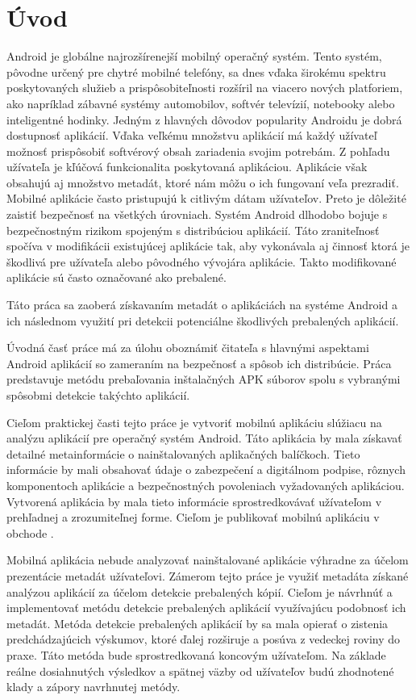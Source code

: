 \chapter{Úvod}
Android je globálne najrozšírenejší mobilný operačný systém. Tento systém, pôvodne určený pre chytré mobilné telefóny, sa dnes vďaka širokému spektru poskytovaných služieb a prispôsobiteľnosti rozšíril na viacero nových platforiem, ako napríklad zábavné systémy automobilov, softvér televízií, notebooky alebo inteligentné hodinky. Jedným z hlavných dôvodov popularity Androidu je dobrá dostupnosť aplikácií. Vďaka veľkému množstvu aplikácií má každý užívateľ možnosť prispôsobiť softvérový obsah zariadenia svojim potrebám. Z pohľadu užívateľa je kľúčová funkcionalita poskytovaná aplikáciou. Aplikácie však obsahujú aj množstvo metadát, ktoré nám môžu o ich fungovaní veľa prezradiť. Mobilné aplikácie často pristupujú k citlivým dátam užívateľov. Preto je dôležité zaistiť bezpečnosť na všetkých úrovniach. Systém Android dlhodobo bojuje s bezpečnostným rizikom spojeným s distribúciou aplikácií. Táto zraniteľnosť spočíva v modifikácii existujúcej aplikácie tak, aby vykonávala aj činnosť ktorá je škodlivá pre užívateľa alebo pôvodného vývojára aplikácie. Takto modifikované aplikácie sú často označované ako prebalené.

Táto práca sa zaoberá získavaním metadát o aplikáciách na systéme Android a ich následnom využití pri detekcii potenciálne škodlivých prebalených aplikácií.

Úvodná časť práce má za úlohu oboznámiť čitateľa s hlavnými aspektami Android aplikácií so zameraním na bezpečnosť a spôsob ich distribúcie. Práca predstavuje metódu prebaľovania inštalačných APK súborov spolu s vybranými spôsobmi detekcie takýchto aplikácií.

Cieľom praktickej časti tejto práce je vytvoriť mobilnú aplikáciu slúžiacu na analýzu aplikácií pre operačný systém Android. Táto aplikácia by mala získavať detailné metainformácie o nainštalovaných aplikačných balíčkoch. Tieto informácie by mali obsahovať údaje o zabezpečení a digitálnom podpise, rôznych komponentoch aplikácie a bezpečnostných povoleniach vyžadovaných aplikáciou. Vytvorená aplikácia by mala tieto informácie sprostredkovávať užívateľom v prehľadnej a zrozumiteľnej forme. Cieľom je publikovať mobilnú aplikáciu v obchode .

Mobilná aplikácia nebude analyzovať nainštalované aplikácie výhradne za účelom prezentácie metadát užívateľovi. Zámerom tejto práce je využiť metadáta získané analýzou aplikácií za účelom detekcie prebalených kópií. Cieľom je návrhnúť a implementovať metódu detekcie prebalených aplikácií využívajúcu podobnosť ich metadát. Metóda detekcie prebalených aplikácií by sa mala opierať o zistenia predchádzajúcich výskumov, ktoré ďalej rozširuje a posúva z vedeckej roviny do praxe. Táto metóda bude sprostredkovaná koncovým užívateľom. Na základe reálne dosiahnutých výsledkov a spätnej väzby od užívateľov budú zhodnotené klady a zápory navrhnutej metódy.

